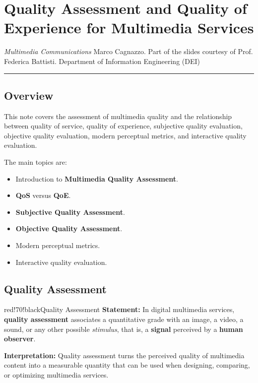 \chapter{Quality Assessment and Quality of Experience for Multimedia Services}

\textit{Multimedia Communications} Marco Cagnazzo. Part of the slides courtesy of Prof. Federica Battisti. Department of Information Engineering (DEI)

\bigskip\hrule\bigskip

\section{Overview}

This note covers the assessment of multimedia quality and the relationship between quality of service, quality of experience, subjective quality evaluation, objective quality evaluation, modern perceptual metrics, and interactive quality evaluation.

The main topics are:

\begin{itemize}
\item Introduction to \textbf{Multimedia Quality Assessment}.
\item \textbf{QoS} versus \textbf{QoE}.
\item \textbf{Subjective Quality Assessment}.
\item \textbf{Objective Quality Assessment}.
\item Modern perceptual metrics.
\item Interactive quality evaluation.
\end{itemize}

\section{Quality Assessment}

\begin{calloutbox}{red!70!black}{Quality Assessment}
\textbf{Statement:} In digital multimedia services, \textbf{quality assessment} associates a quantitative grade with an image, a video, a sound, or any other possible \textit{stimulus}, that is, a \textbf{signal} perceived by a \textbf{human observer}.

\textbf{Interpretation:} Quality assessment turns the perceived quality of multimedia content into a measurable quantity that can be used when designing, comparing, or optimizing multimedia services.
\end{calloutbox}

